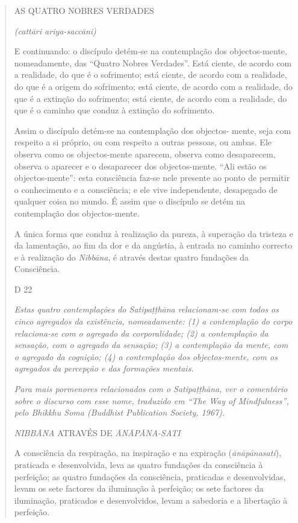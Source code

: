 \begin{quote}
AS QUATRO NOBRES VERDADES

\emph{(cattāri ariya-saccāni)}

E continuando: o discípulo detém-se na contemplação dos objectos-mente, nomeadamente, das ``Quatro Nobres Verdades''. Está ciente, de acordo com a realidade, do que é o sofrimento; está ciente, de acordo com a realidade, do que é a origem do sofrimento; está ciente, de acordo com a realidade, do que é a extinção do sofrimento; está ciente, de acordo com a realidade, do que é o caminho que conduz à extinção do sofrimento.

Assim o discípulo detém-se na contemplação dos objectos- mente, seja com respeito a si próprio, ou com respeito a outras pessoas, ou ambas. Ele observa como os objectos-mente aparecem, observa como desaparecem, observa o aparecer e o desaparecer dos objectos-mente. ``Ali estão os objectos-mente'': esta consciência faz-se nele presente ao ponto de permitir o conhecimento e a consciência; e ele vive independente, desapegado de qualquer coisa no mundo. É assim que o discípulo se detém na contemplação dos objectos-mente.

A única forma que conduz à realização da pureza, à superação da tristeza e da lamentação, ao fim da dor e da angústia, à entrada no caminho correcto e à realização do \emph{Nibbāna}, é através destas quatro fundações da Consciência.

D 22

\emph{Estas quatro contemplações do Satipaṭṭhāna relacionam-se com todos os cinco agregados da existência, nomeadamente: (1) a contemplação do corpo relaciona-se com o agregado da corporalidade; (2) a contemplação da sensação, com o agregado da sensação; (3) a contemplação da mente, com o agregado da cognição; (4) a contemplação dos objectos-mente, com os agregados da percepção e das formações mentais.}

\emph{Para mais pormenores relacionados com o Satipaṭṭhāna, ver o comentário sobre o discurso com esse nome, traduzido em ``The Way of Mindfulness'', pelo Bhikkhu Soma (Buddhist Publication Society, 1967).}

\emph{NIBBĀNA} ATRAVÉS DE \emph{ĀNĀPĀNA-SATI}

A consciência da respiração, na inspiração e na expiração (\emph{ānāpānasati}), praticada e desenvolvida, leva as quatro fundações da consciência à perfeição; as quatro fundações da consciência, praticadas e desenvolvidas, levam os sete factores da iluminação à perfeição; os sete factores da iluminação, praticados e desenvolvidos, levam a sabedoria e a libertação à perfeição.


\end{quote}
